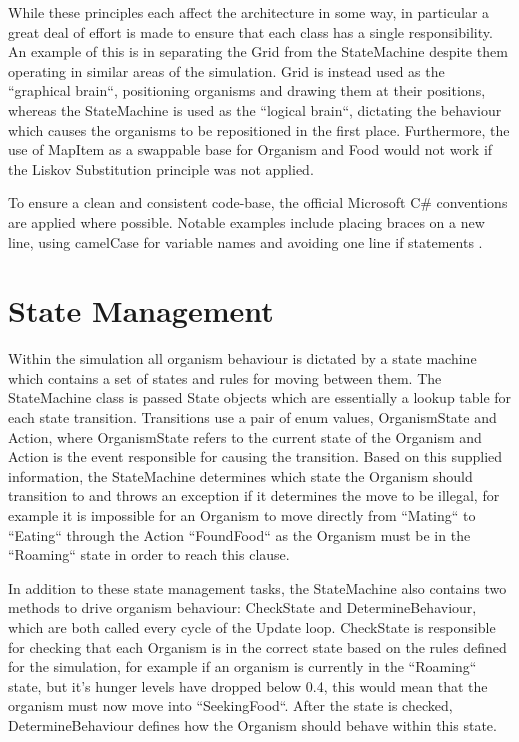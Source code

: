 \documentclass[a4paper, oneside, 11pt]{report}
\begin{document}
While these principles each affect the architecture in some way, in particular a great deal of effort is made to ensure that each class has a single responsibility. An example of this is in separating the Grid from the StateMachine despite them operating in similar areas of the simulation. Grid is instead used as the ``graphical brain``, positioning organisms and drawing them at their positions, whereas the StateMachine is used as the ``logical brain``, dictating the behaviour which causes the organisms to be repositioned in the first place. Furthermore, the use of MapItem as a swappable base for Organism and Food would not work if the Liskov Substitution principle was not applied.

To ensure a clean and consistent code-base, the official Microsoft C\# conventions are applied where possible. Notable examples include placing braces on a new line, using camelCase for variable names and avoiding one line if statements \cite{microsoft}.

\section{State Management}\label{statemanagement}
Within the simulation all organism behaviour is dictated by a state machine which contains a set of states and rules for moving between them. The StateMachine class is passed State objects which are essentially a lookup table for each state transition. Transitions use a pair of enum values, OrganismState and Action, where OrganismState refers to the current state of the Organism and Action is the event responsible for causing the transition. Based on this supplied information, the StateMachine determines which state the Organism should transition to and throws an exception if it determines the move to be illegal, for example it is impossible for an Organism to move directly from ``Mating`` to ``Eating`` through the Action ``FoundFood`` as the Organism must be in the ``Roaming`` state in order to reach this clause.

In addition to these state management tasks, the StateMachine also contains two methods to drive organism behaviour: CheckState and DetermineBehaviour, which are both called every cycle of the Update loop. CheckState is responsible for checking that each Organism is in the correct state based on the rules defined for the simulation, for example if an organism is currently in the ``Roaming`` state, but it's hunger levels have dropped below 0.4, this would mean that the organism must now move into ``SeekingFood``. After the state is checked, DetermineBehaviour defines how the Organism should behave within this state.
\end{document}
